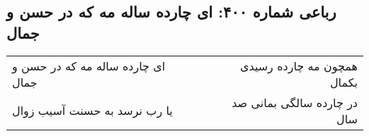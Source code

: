 \begin{center}
\section*{رباعی شماره ۴۰۰: ای چارده ساله مه که در حسن و جمال}
\label{sec:sh400}
\begin{longtable}{l p{0.5cm} r}
ای چارده ساله مه که در حسن و جمال
&&
همچون مه چارده رسیدی بکمال
\\
یا رب نرسد به حسنت آسیب زوال
&&
در چارده سالگی بمانی صد سال
\\
\end{longtable}
\end{center}
